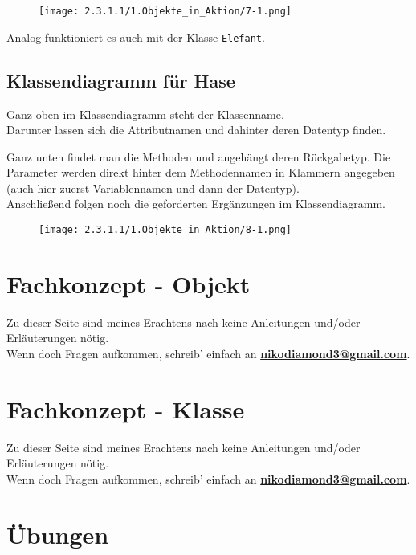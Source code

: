 \documentclass[]{scrartcl}   %
\begin{document}
\begin{figure}[ht]
	\centering
	\texttt{[image: 2.3.1.1/1.Objekte\_in\_Aktion/7-1.png]}
\end{figure}

Analog funktioniert es auch mit der Klasse \texttt{Elefant}.

\newpage
\subsection{Klassendiagramm für Hase}

Ganz oben im Klassendiagramm steht der Klassenname.\\
Darunter lassen sich die Attributnamen und dahinter deren Datentyp finden.

Ganz unten findet man die Methoden und angehängt deren Rückgabetyp. Die Parameter werden direkt hinter dem Methodennamen in Klammern angegeben (auch hier zuerst Variablennamen und dann der Datentyp).\\

Anschließend folgen noch die geforderten Ergänzungen im Klassendiagramm.\\

\begin{figure}[ht]
	\centering
	\texttt{[image: 2.3.1.1/1.Objekte\_in\_Aktion/8-1.png]}
\end{figure}

\newpage

\section{Fachkonzept - Objekt}
Zu dieser Seite sind meines Erachtens nach keine Anleitungen und/oder Erläuterungen nötig.\\
Wenn doch Fragen aufkommen, schreib' einfach an \textbf{\href{mailto:nikodiamond3@gmail.com}{nikodiamond3@gmail.com}}.

\newpage

\section{Fachkonzept - Klasse}
Zu dieser Seite sind meines Erachtens nach keine Anleitungen und/oder Erläuterungen nötig.\\
Wenn doch Fragen aufkommen, schreib' einfach an \textbf{\href{mailto:nikodiamond3@gmail.com}{nikodiamond3@gmail.com}}.

\newpage

\section{Übungen}
\end{document}

